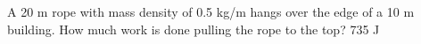 {A 20 m rope with mass density of 0.5 kg/m hangs over the edge of a 10 m building. How much work is done pulling the rope to the top?}
{735 J}
